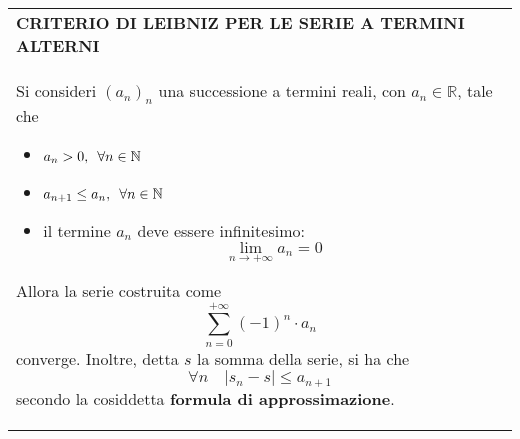 \documentclass[a4paper]{extarticle}
\renewcommand\arraystretch{}
\begin{document}
\vspace{1em}
\setlength{\tabcolsep}{14pt}
\renewcommand{\arraystretch}{2}
\noindent
\begin{tabularx}{\textwidth}{@{}|P|@{}}
    \hline
    {\textbf{CRITERIO DI LEIBNIZ PER LE SERIE A TERMINI ALTERNI}}\\
    \parbox{\linewidth}{Si consideri $(a_n)_n$ una successione a termini reali, con $a_n \in \mathbb{R}$, tale che
    \begin{itemize}
        \item $a_n > 0, \hspace{0.5em} \forall n \in \mathbb{N}$
        \item $a_{n+1} \leq a_n, \hspace{0.5em} \forall n \in \mathbb{N}$
        \item il termine $a_n$ deve essere infinitesimo:
        \[\lim_{n \to +\infty} a_n = 0\]
    \end{itemize}
    Allora la serie costruita come
    \[\sum_{n=0}^{+\infty} (-1)^n \cdot a_n\]
    converge. Inoltre, detta $s$ la somma della serie, si ha che
    \[\forall n \hspace{1em} \left \vert s_n-s \right \vert \leq a_{n+1}\]
    secondo la cosiddetta \textbf{formula di approssimazione}.\vspace{3mm}}\\
    \hline
\end{tabularx}
\end{document}
